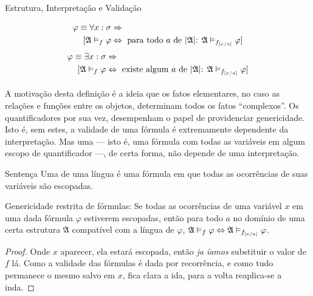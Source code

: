 \begin{definition}{Estrutura, Interpretação e Validação}
\begin{align*}
                    [\mathfrak{A}\vDash_f\varphi&\BIM\mathfrak A\vDash_f\neg\sigma\text{ ou }\mathfrak A\vDash_f\psi]
            \end{align*}
            \begin{align*}
                \varphi\equiv \forall x:\sigma&\RAR\\
                    [\mathfrak{A}\vDash_f\varphi&\BIM\text{ para todo $a$ de    $|\mathfrak A|$: }
                    \mathfrak A\vDash_{f_{[x\slash{a}]}}\varphi]
            \end{align*}
            \begin{align*}
                \varphi\equiv \exists x:\sigma&\RAR\\
                    [\mathfrak{A}\vDash_f\varphi&\BIM\text{ existe algum $a$ de $|\mathfrak A|$: }
                    \mathfrak A\vDash_{f_{[x\slash{a}]}}\varphi]
            \end{align*}
        \paragraph{}
            A motivação desta definição é a ideia que os fatos elementares,
            no caso as relações e funções entre os objetos, determinam todos 
            os fatos ``complexos''. Os quantificadores por sua vez, desempenham o papel de providenciar
            genericidade. Isto é, sem estes, a validade de uma fórmula é 
            extremamente dependente da interpretação. Mas uma  
            --- isto é, uma fórmula com todas as variáveis em algum escopo de 
            quantificador ---, de certa forma, não depende de uma interpretação. 
    \end{definition}

    \begin{definition}{Sentença}
        Uma  de uma língua é uma fórmula em que todas as ocorrências 
        de suas variáveis são escopadas.
    \end{definition}

    \begin{lemma}{Genericidade restrita de fórmulas:}
        Se todas as ocorrências de uma variável $x$ em uma dada fórmula $\varphi$ 
        estiverem escopadas, então para todo $a$ no domínio de uma certa estrutura 
        $\mathfrak{A}$ compatível com a língua de $\varphi$, $\mathfrak{A}\vDash_{f}
        \varphi\Leftrightarrow\mathfrak{A}\vDash_{f_{[x\slash{a}]}}\varphi$.
        \begin{proof}
            Onde $x$ aparecer, ela estará escopada, então \emph{ja íamos} substituir
            o valor de $f$ lá. Como a validade das fórmulas é dada por recorrência,
            e como tudo permanece o mesmo salvo em $x$, fica clara a ida, para a volta 
            reaplica-se a inda.\eop
        \end{proof}
    \end{lemma}

